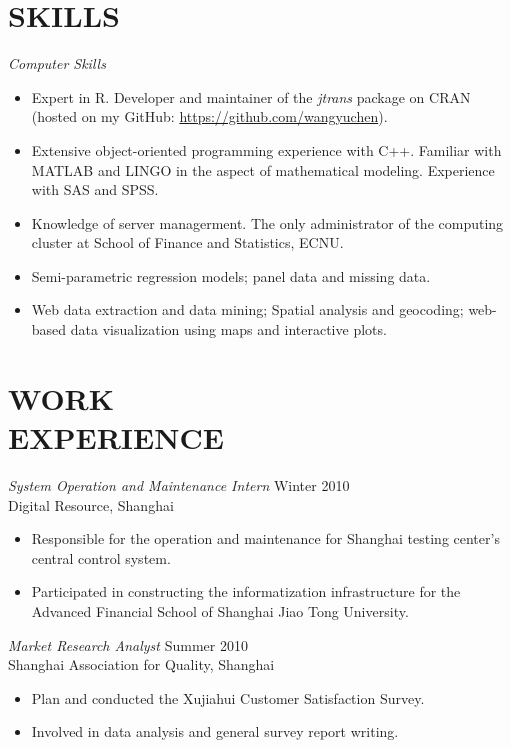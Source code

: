 \documentclass[margin]{res}
\begin{document}
\begin{resume}
		
		\section{SKILLS}
		{\sl Computer Skills}
		\begin{itemize}  \itemsep -2pt %
			\item Expert in R. Developer and maintainer of the \emph{jtrans} package on CRAN (hosted on my GitHub: \url{https://github.com/wangyuchen}). 
			\item Extensive object-oriented programming experience with C++. Familiar with MATLAB and LINGO in the aspect of mathematical modeling. Experience with SAS and SPSS. 
			\item Knowledge of server managerment. The only administrator of the computing cluster at School of Finance and Statistics, ECNU. 
			\item Semi-parametric regression models; panel data and missing data.
			\item Web data extraction and data mining; Spatial analysis and geocoding; web-based data visualization using maps and interactive plots.
		\end{itemize}
		
		
		\section{WORK \\EXPERIENCE} 
		{\sl System Operation and Maintenance Intern} \hfill Winter 2010 \\
		Digital Resource, Shanghai
		\begin{itemize}  \itemsep -2pt %
			\item Responsible for the operation and maintenance for Shanghai testing center's central control system.
			\item Participated in constructing the informatization infrastructure for the Advanced Financial School of Shanghai Jiao Tong University.
		\end{itemize} 
		
		{\sl Market Research Analyst} \hfill Summer 2010 \\
        Shanghai Association for Quality, Shanghai
        \begin{itemize}  \itemsep -2pt %
			\item Plan and conducted the Xujiahui Customer Satisfaction Survey.
        	\item Involved in data analysis and general survey report writing.
        \end{itemize}
		

\end{resume}
\end{document}
